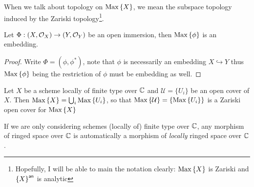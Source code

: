 When we talk about topology on $\operatorname{Max}\left\{X\right\}$, we mean the subspace topology induced by the Zariski topology\footnote{Hopefully, I will be able to main the notation clearly: $\operatorname{Max}\left\{X\right\}$ is Zariski and ${\left\{{X}\right\}}^{\mathsf{an}}$ is analytic}.

\begin{corollary}
  Let $\Phi: \left(X, \mathcal{O}_{X}\right) \to \left(Y, \mathcal{O}_{Y}\right)$ be an open immersion, then $\operatorname{Max}\left\{\phi\right\}$ is an embedding.
\end{corollary}

\begin{proof}
  Write $\Phi= (\phi, \phi^{*})$, note that $\phi$ is necessarily an embedding $X \hookrightarrow Y$ thus $\operatorname{Max}\left\{\phi\right\}$ being the restriction of $\phi$ must be embedding as well.
\end{proof}

\begin{remark}
  Let $X$ be a scheme locally of finite type over $\mathbb{C}$ and $\mathcal{U} = \{U_{i}\}$ be an open cover of $X$. Then $\operatorname{Max}\left\{X\right\} = \bigcup_{i}\operatorname{Max}\left\{U_{i}\right\}$, so that $\operatorname{Max}\left\{\mathcal{U}\right\} = \{\operatorname{Max}\left\{U_{i}\right\}\}$ is a Zariski open cover for $\operatorname{Max}\left\{X\right\}$
\end{remark}

\begin{remark}
  If we are only considering schemes (locally of) finite type over $\mathbb{C}$, any morphism of ringed space over $\mathbb{C}$ is automatically a morphism of {\em locally\/} ringed space over $\mathbb{C}$.
\end{remark}

